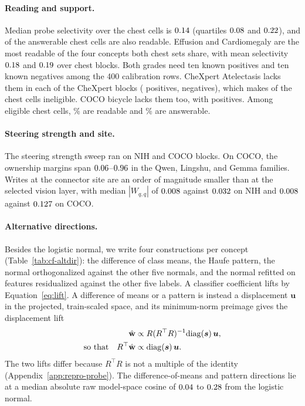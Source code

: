 \paragraph{Reading and support.} Median probe selectivity over the chest cells is $0.14$ (quartiles $0.08$ and $0.22$), and \cfReadAns{} of the \cfChestAnswerable{} answerable chest cells are also readable. Effusion and Cardiomegaly are the most readable of the four concepts both chest sets share, with mean selectivity $0.18$ and $0.19$ over \cfChestProbeBlocks{} chest blocks. Both grades need ten known positives and ten known negatives among the 400 calibration rows. CheXpert Atelectasis lacks them in each of the \cfSupportInelChexBlocks{} CheXpert blocks (\cfCalChexInelPos{} positives, \cfCalChexInelNeg{} negatives), which makes \cfSupportInelChest{} of the \cfChestCellsN{} chest cells ineligible. COCO bicycle lacks them too, with \cfCalCocoInelPos{} positives. Among eligible chest cells, \cfSupportReadablePctChest\% are readable and \cfSupportAnswerablePctChest\% are answerable.

\paragraph{Steering strength and site.} The steering strength sweep ran on \cfDoseBlocksNih{} NIH and \cfDoseBlocksCoco{} COCO blocks. On COCO, the ownership margins span $0.06$--$0.96$ in the Qwen, Lingshu, and Gemma families. Writes at the connector site are an order of magnitude smaller than at the selected vision layer, with median $|W_{q,q}|$ of $0.008$ against $0.032$ on NIH and $0.008$ against $0.127$ on COCO.

\paragraph{Alternative directions.} Besides the logistic normal, we write four constructions per concept (Table~\ref{tab:cf-altdir}): the difference of class means, the Haufe pattern, the normal orthogonalized against the other five normals, and the normal refitted on features residualized against the other five labels. A classifier coefficient lifts by Equation~\ref{eq:lift}. A difference of means or a pattern is instead a displacement $\boldsymbol u$ in the projected, train-scaled space, and its minimum-norm preimage gives the displacement lift
\begin{equation}
\begin{aligned}
\hat{\mathbf{w}}&\propto R(R^{\top}R)^{-1}\mathrm{diag}(\boldsymbol s)\,\boldsymbol u,\\
\text{so that}\quad R^{\top}\hat{\mathbf{w}}&\propto\mathrm{diag}(\boldsymbol s)\,\boldsymbol u .
\end{aligned}
\label{eq:displacement-lift}
\end{equation}
The two lifts differ because $R^{\top}R$ is not a multiple of the identity (Appendix~\ref{app:repro-probe}). The difference-of-means and pattern directions lie at a median absolute raw model-space cosine of $0.04$ to $0.28$ from the logistic normal.

